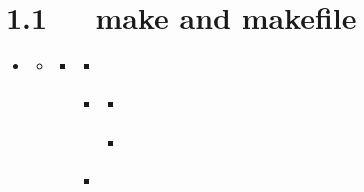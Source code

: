 \documentclass[letterpaper,12pt,english]{sphinxmanual}
\begin{document}
\section{1.1   make and makefile}
\label{\detokenize{001software/001install/make:make-and-makefile}}
\begin{sphinxShadowBox}
\begin{itemize}
\item {} 
\label{\detokenize{001software/001install/make:id19}}{\hyperref[\detokenize{001software/001install/make:make}]{}}
\begin{itemize}
\item {} 
\label{\detokenize{001software/001install/make:id20}}{\hyperref[\detokenize{001software/001install/make:make-and-makefile}]{}}
\begin{itemize}
\item {} 
\label{\detokenize{001software/001install/make:id21}}{\hyperref[\detokenize{001software/001install/make:id2}]{}}
\begin{itemize}
\item {} 
\label{\detokenize{001software/001install/make:id22}}{\hyperref[\detokenize{001software/001install/make:gnu-make}]{}}

\item {} 
\label{\detokenize{001software/001install/make:id23}}{\hyperref[\detokenize{001software/001install/make:help}]{}}
\begin{itemize}
\item {} 
\label{\detokenize{001software/001install/make:id24}}{\hyperref[\detokenize{001software/001install/make:gnu}]{}}

\item {} 
\label{\detokenize{001software/001install/make:id25}}{\hyperref[\detokenize{001software/001install/make:id3}]{}}

\end{itemize}

\item {} 
\label{\detokenize{001software/001install/make:id26}}{\hyperref[\detokenize{001software/001install/make:make-misc}]{}}


\end{itemize}
\end{itemize}
\end{itemize}
\end{itemize}
\end{sphinxShadowBox}
\end{document}
